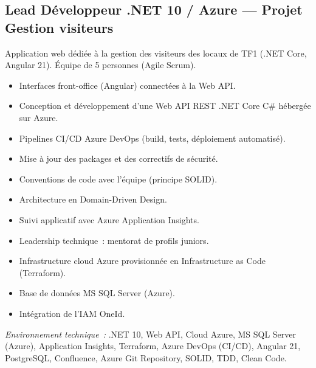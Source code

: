 \documentclass[10pt,a4paper]{article}
\begin{document}
\vspace{4pt}

\subsection*{Lead Développeur .NET 10 / Azure --- Projet Gestion visiteurs}
\color{darkgray}
Application web dédiée à la gestion des visiteurs des locaux de TF1 (.NET Core, Angular 21). Équipe de 5 personnes (Agile Scrum).
\begin{itemize}
  \item Interfaces front-office (Angular) connectées à la Web API.
  \item Conception et développement d'une Web API REST .NET Core C\# hébergée sur Azure.
  \item Pipelines CI/CD Azure DevOps (build, tests, déploiement automatisé).
  \item Mise à jour des packages et des correctifs de sécurité.
  \item Conventions de code avec l'équipe (principe SOLID).
  \item Architecture en Domain-Driven Design.
  \item Suivi applicatif avec Azure Application Insights.
  \item Leadership technique~: mentorat de profils juniors.
  \item Infrastructure cloud Azure provisionnée en Infrastructure as Code (Terraform).
  \item Base de données MS SQL Server (Azure).
  \item Intégration de l'IAM OneId.
\end{itemize}
\textit{Environnement technique~:} .NET 10, Web API, Cloud Azure, MS SQL Server (Azure), Application Insights, Terraform, Azure DevOps (CI/CD), Angular 21, PostgreSQL, Confluence, Azure Git Repository, SOLID, TDD, Clean Code.

\vspace{6pt}
\end{document}
